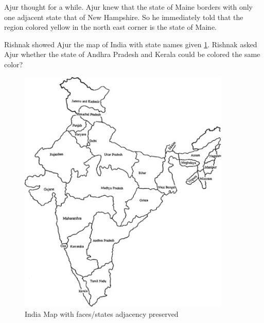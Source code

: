 Ajur thought for a while. Ajur knew that the state of Maine borders with only one adjacent state that of New Hampshire. So he immediately told that the region colored yellow in the north east corner is the state of Maine.

Rishnak showed Ajur the map of India with state names given \ref{10g10}. Rishnak asked Ajur whether the state of Andhra Pradesh and Kerala could be colored the same color?

\begin{figure}
\begin{center}
\includegraphics[width=0.9\textwidth]{MapIndia.jpg}
\end{center}
\caption{India Map with faces/states adjacency preserved}\label{10g10}
\end{figure}


